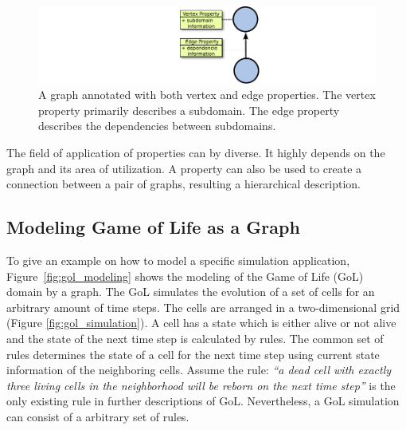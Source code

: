 \begin{figure}[H]
  \centering \includegraphics[width=\textwidth]{graphics/30_property}
  \caption{A graph annotated with both vertex and edge properties. The vertex
    property primarily describes a subdomain. The edge property
    describes the dependencies between subdomains.}
  \label{fig:property}
\end{figure}

\noindent The field of application of properties can by diverse. It highly
depends on the graph and its area of utilization.  A property can also
be used to create a connection between a pair of graphs, resulting a
hierarchical description.



\subsection{Modeling Game of Life as a Graph}
\label{sec:gol}
To give an example on how to model a specific simulation application,
Figure~\ref{fig:gol_modeling} shows the modeling of the Game of Life
(GoL)~\cite{ref:gol} domain by a graph. The GoL simulates the evolution of
a set of cells for an arbitrary amount of time steps. The cells are
arranged in a two-dimensional grid (Figure \ref{fig:gol_simulation}).
A cell has a state which is either alive or not alive and the state of
the next time step is calculated by rules.  The common set of rules
determines the state of a cell for the next time step using current
state information of the neighboring cells.  Assume the rule: \emph{``a dead
cell with exactly three living cells in the neighborhood will be reborn on
the next time step''} is the only existing rule in further descriptions
of GoL.  Nevertheless, a GoL simulation can consist of a arbitrary set
of rules.

